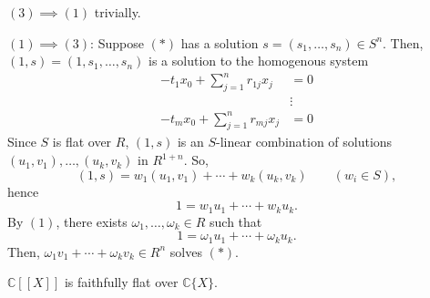 $(3)\implies (1)$ trivially.

$(1)\implies (3)$: Suppose $(*)$ has a solution $s=(s_1, \dots, s_n)\in S^n$.  Then, $(1, s)= (1, s_1, \dots, s_n)$ is a solution to the homogenous system
\begin{align*} -t_1x_0+\sum_{j=1}^n r_{1j}x_j &=  0  \\
				&\vdots     \tag{$**$} \\
		-t_mx_0 + \sum_{j=1}^n r_{mj}x_j  & =  0 \end{align*}
Since $S$ is flat over $R$, $(1, s)$ is an $S$-linear combination of solutions $(u_1, v_1), \dots, (u_k, v_k)$ in $R^{1+n}$. So,
$$(1, s) = w_1(u_1, v_1) + \cdots + w_k(u_k, v_k) \qquad (w_i\in S),$$
hence
$$1= w_1 u_1 + \cdots + w_k u_k.$$
By $(1)$, there exists $\omega_1, \dots, \omega_k\in R$ such that
$$1= \omega_1u_1 + \cdots + \omega_k u_k.$$
Then, $\omega_1v_1+\cdots + \omega_k v_k\in R^n$ solves $(*)$. 



\begin{theorem} $\mathds{C}[[X]]$ is faithfully flat over $\mathds{C}\{X\}$. \end{theorem}


